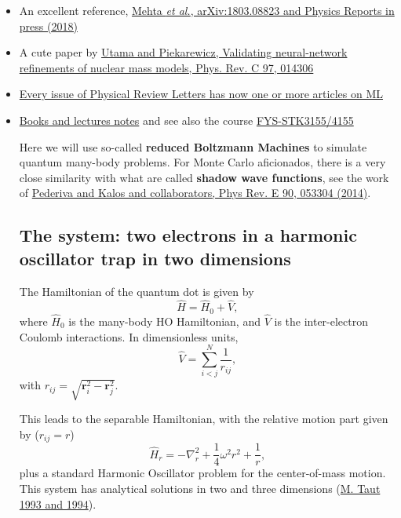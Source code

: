\documentclass[aip,jcp,reprint,floatfix]{revtex4-1}
\begin{document}
\begin{itemize}
\item An excellent reference, \href{{https://arxiv.org/abs/1803.08823}}{Mehta \emph{et al.}, arXiv:1803.08823 and Physics Reports in press (2018)}

\item A cute paper by \href{{https://journals.aps.org/prc/abstract/10.1103/PhysRevC.97.014306}}{Utama and Piekarewicz, Validating neural-network refinements of nuclear mass models, Phys. Rev. C 97, 014306}

\item \href{{https://journals.aps.org/prl/abstract/10.1103/PhysRevLett.120.156001}}{Every issue of Physical Review Letters has now one or more articles on ML}

\item \href{{https://github.com/CompPhysics/MachineLearning}}{Books and lectures notes} and see also the course \href{{https://www.uio.no/studier/emner/matnat/fys/FYS-STK4155/h18/index.html}}{FYS-STK3155/4155}


Here we will use so-called \textbf{reduced Boltzmann Machines} to simulate quantum many-body problems. For Monte Carlo aficionados, there is a very close similarity with what are called \textbf{shadow wave functions}, see the work of \href{{https://journals.aps.org/pre/abstract/10.1103/PhysRevE.90.053304}}{Pederiva and Kalos and collaborators, Phys Rev. E 90, 053304 (2014)}.






\subsection*{The system: two electrons in a harmonic oscillator trap in two dimensions}

The Hamiltonian of the quantum dot is given by
\[ \hat{H} = \hat{H}_0 + \hat{V}, 
\]
where $\hat{H}_0$ is the many-body HO Hamiltonian, and $\hat{V}$ is the
inter-electron Coulomb interactions. In dimensionless units,
\[ \hat{V}= \sum_{i < j}^N \frac{1}{r_{ij}},
\]
with $r_{ij}=\sqrt{\mathbf{r}_i^2 - \mathbf{r}_j^2}$.

This leads to the  separable Hamiltonian, with the relative motion part given by ($r_{ij}=r$)
\[ 
\hat{H}_r=-\nabla^2_r + \frac{1}{4}\omega^2r^2+ \frac{1}{r},
\]
plus a standard Harmonic Oscillator problem  for the center-of-mass motion.
This system has analytical solutions in two and three dimensions (\href{{https://journals.aps.org/pra/abstract/10.1103/PhysRevA.48.3561}}{M. Taut 1993 and 1994}). 


\end{itemize}
\end{document}
